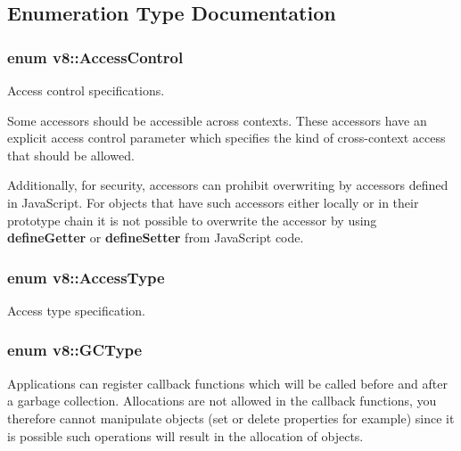 \subsection{Enumeration Type Documentation}
\hypertarget{namespacev8_a31d8355cb043d7d2dda3f4a52760b64e}{}
\subsubsection[{Access\+Control}]{\setlength{\rightskip}{0pt plus 5cm}enum {\bf v8\+::\+Access\+Control}}\label{namespacev8_a31d8355cb043d7d2dda3f4a52760b64e}
Access control specifications.

Some accessors should be accessible across contexts. These accessors have an explicit access control parameter which specifies the kind of cross-\/context access that should be allowed.

Additionally, for security, accessors can prohibit overwriting by accessors defined in Java\+Script. For objects that have such accessors either locally or in their prototype chain it is not possible to overwrite the accessor by using {\bfseries define\+Getter} or {\bfseries define\+Setter} from Java\+Script code. \hypertarget{namespacev8_add8bef6469c5b94706584124e610046c}{}
\subsubsection[{Access\+Type}]{\setlength{\rightskip}{0pt plus 5cm}enum {\bf v8\+::\+Access\+Type}}\label{namespacev8_add8bef6469c5b94706584124e610046c}
Access type specification. \hypertarget{namespacev8_ac109d6f27e0c0f9ef4e98bcf7a806cf2}{}
\subsubsection[{G\+C\+Type}]{\setlength{\rightskip}{0pt plus 5cm}enum {\bf v8\+::\+G\+C\+Type}}\label{namespacev8_ac109d6f27e0c0f9ef4e98bcf7a806cf2}
Applications can register callback functions which will be called before and after a garbage collection. Allocations are not allowed in the callback functions, you therefore cannot manipulate objects (set or delete properties for example) since it is possible such operations will result in the allocation of objects. \hypertarget{namespacev8_a06f34fa4fa4cfc8518366808d1d461c1}{}
